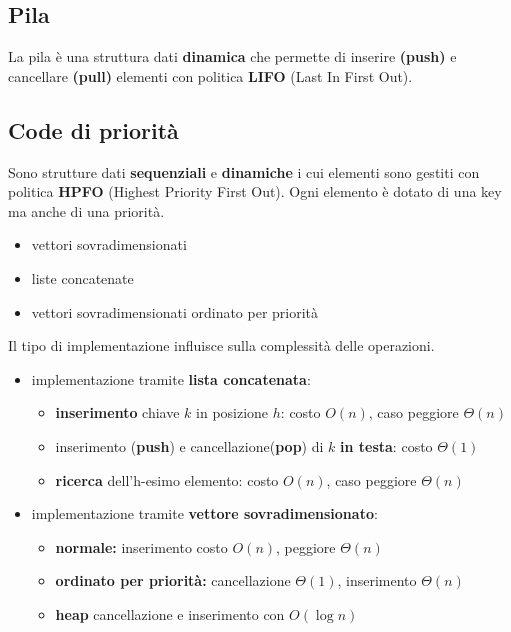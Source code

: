 \documentclass{article}
\begin{document}
\subsection{Pila} %
La pila è una struttura dati \textbf{dinamica} che permette di inserire \textbf{(push)} e cancellare \textbf{(pull)}
 elementi con politica \textbf{LIFO} (Last In First Out).
\subsection{Code di priorità} %
Sono strutture dati \textbf{sequenziali} e \textbf{dinamiche} i cui elementi sono gestiti con politica \textbf{HPFO} (Highest Priority First Out).
 Ogni elemento è dotato di una key ma anche di una priorità.
\begin{itemize}
    \item vettori sovradimensionati
    \item liste concatenate
    \item vettori sovradimensionati ordinato per priorità
\end{itemize}
Il tipo di implementazione influisce sulla complessità delle operazioni.
\begin{itemize}

\item implementazione tramite \textbf{lista concatenata}: 
\begin{itemize}
    \item \textbf{inserimento} chiave $k$ in posizione $h$: costo $O(n)$, caso peggiore $\Theta(n)$
    \item inserimento (\textbf{push}) e cancellazione(\textbf{pop}) di $k$ \textbf{in testa}: costo $\Theta(1)$ 
    \item \textbf{ricerca} dell'h-esimo elemento: costo $O(n)$, caso peggiore $\Theta(n)$
\end{itemize}
\item implementazione tramite \textbf{vettore sovradimensionato}:
\begin{itemize}
    \item \textbf{normale:} inserimento costo $O(n)$, peggiore $\Theta(n)$
    \item \textbf{ordinato per priorità:} cancellazione $\Theta(1)$, inserimento $\Theta(n)$
    \item \textbf{heap} cancellazione e inserimento con $O(\log n)$
\end{itemize}
\end{itemize}
\end{document}
